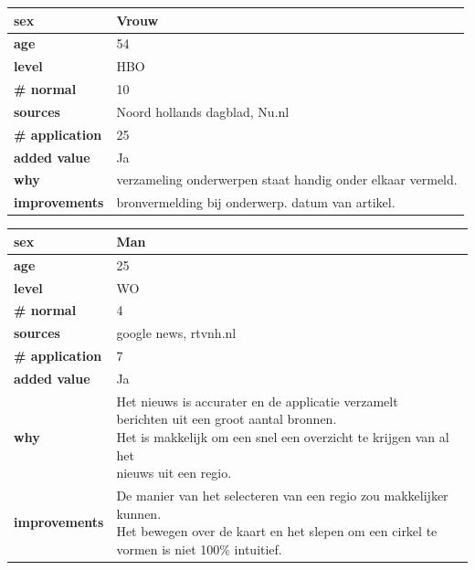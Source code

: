 \documentclass[twoside,openright]{uva-bachelor-thesis}
\begin{document}
\begin{table}
	\centering
	\begin{tabular}{|l|l|}
		\hline
		\textbf{sex} & Vrouw \\ \hline
		\textbf{age} & 54 \\ \hline
		\textbf{level} & HBO \\ \hline
		\textbf{\# normal} & 10 \\ \hline
		\textbf{sources} & Noord hollands dagblad, Nu.nl
		\\ \hline
		\textbf{\# application} & 25 \\ \hline
		\textbf{added value} & Ja \\ \hline
		\textbf{why} & verzameling onderwerpen staat handig onder elkaar vermeld.
		
		
		\\ \hline
		
		\textbf{improvements} & bronvermelding bij onderwerp.
		datum van artikel.
		
		
		\\ \hline
	\end{tabular}
\end{table}
\begin{table}
	\centering
	\begin{tabular}{|l|l|}
		\hline
		\textbf{sex} & Man \\ \hline
		\textbf{age} & 25 \\ \hline
		\textbf{level} & WO \\ \hline
		\textbf{\# normal} & 4 \\ \hline
		\textbf{sources} & google news, rtvnh.nl
		\\ \hline
		\textbf{\# application} & 7 \\ \hline
		\textbf{added value} & Ja \\ \hline
		\textbf{why} & \pbox{20cm}{Het nieuws is accurater en de applicatie verzamelt\\ berichten uit een groot aantal bronnen.
		\\Het is makkelijk om een snel een overzicht te krijgen van al het \\nieuws uit een regio.}
		
		
		
		\\ \hline
		
		\textbf{improvements} & \pbox{20cm}{De manier van het selecteren van een regio zou makkelijker kunnen. \\ Het bewegen over de kaart en het slepen om een cirkel te vormen is niet 100\% intuitief.}
		
		
		
		\\ \hline
	\end{tabular}
\end{table}
\end{document}
